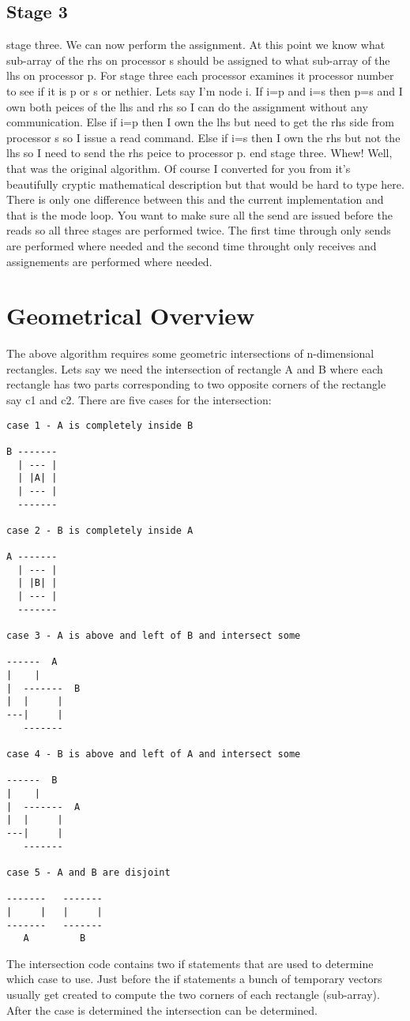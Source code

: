 \subsection*{Stage 3}
stage three.  We can now perform the assignment.  At this point
we know what sub-array of the rhs on processor s should be assigned to
what sub-array of the lhs on processor p.  For stage three each processor
examines it processor number to see if it is p or s or nethier.   Lets
say I'm node i.  If i=p and i=s then p=s and I own both peices of the
lhs and rhs so I can do the assignment without any communication.  Else
if i=p then I own the lhs but need to get the rhs side from processor s
so I issue a read command.  Else if i=s then I own the rhs but not the
lhs so I need to send the rhs peice to processor p.
end stage three.
Whew!
Well, that was the original algorithm.  Of course I converted for
you from it's beautifully cryptic mathematical description 
but that would be hard to type here.  There is
only one difference between this and the current implementation and
that is the mode loop.  You want to make sure all the send are issued
before the reads so all three stages are performed twice.  The first
time through only sends are performed where needed and the second time
throught only receives and assignements are performed where needed.
\section*{Geometrical Overview}
The above algorithm requires some geometric intersections of 
n-dimensional rectangles.  Lets say we need the intersection of
rectangle A and B where each rectangle has two parts corresponding
to two opposite corners of the rectangle say c1 and c2.  There
are five cases for the intersection:
\begin{verbatim}
case 1 - A is completely inside B

B -------
  | --- |
  | |A| |
  | --- |
  -------

case 2 - B is completely inside A

A -------
  | --- |
  | |B| |
  | --- |
  -------

case 3 - A is above and left of B and intersect some

------  A
|    |
|  -------  B
|  |     |
---|     |
   -------

case 4 - B is above and left of A and intersect some

------  B
|    |
|  -------  A
|  |     |
---|     |
   -------

case 5 - A and B are disjoint

-------   -------
|     |   |     |
-------   -------
   A         B
\end{verbatim}
The intersection code contains two if statements that are used to determine
which case to use.  Just before the if statements a bunch of temporary vectors
usually get created to compute the two corners of each rectangle (sub-array).
After the case is determined the intersection can be determined.

